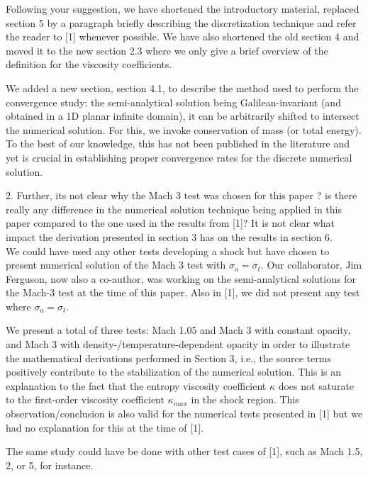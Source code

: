 \documentclass{article}
\begin{document}
Following your suggestion, we have shortened the introductory material, replaced section 5 by a paragraph briefly describing the discretization technique and refer the reader to [1] whenever possible. We have also shortened the old section 4 and moved it to the new section 2.3 where we only give a brief overview of the definition for the viscosity coefficients. 

We added a new section, section 4.1, to describe the method used to perform the convergence study: the semi-analytical solution being Galilean-invariant (and obtained in a 1D planar infinite domain), it can be arbitrarily shifted to intersect the numerical solution. For this, we invoke conservation of mass (or total energy). To the best of our knowledge, this has not been published in the literature and yet is crucial in establishing proper convergence rates for the 
discrete numerical solution. 
\bigskip

{\color{blue}
2. Further, its not clear why the Mach 3 test was chosen for this paper ? is there really any difference in the numerical solution technique being applied in this paper compared to the one used in the results from [1]? It is not clear what impact the derivation presented in section 3 has on the results in section 6.\\}
We could have used any other tests developing a shock but have chosen to present numerical solution of the Mach 3 test with $\sigma_a = \sigma_t$. Our collaborator, Jim Ferguson, now also a co-author, was working on the semi-analytical solutions for the Mach-3 test at the time of this paper. Also in [1], we did not present any test where $\sigma_a = \sigma_t$. 

We present a total of three tests: Mach 1.05 and Mach 3 with constant opacity, and Mach 3 with density-/temperature-dependent opacity in order to illustrate the mathematical derivations performed in Section 3, i.e., the source terms positively contribute to the stabilization of the numerical solution. This is an explanation to the fact that the entropy viscosity coefficient $\kappa$ does not saturate to the first-order viscosity coefficient $\kappa_{max}$ in the shock region. This observation/conclusion is also valid for the numerical tests presented in [1] but we had no explanation for this at the time of [1].

The same study could have be done with other test cases of [1], such as Mach 1.5, 2, or 5, for instance. 
\bigskip
\end{document}
